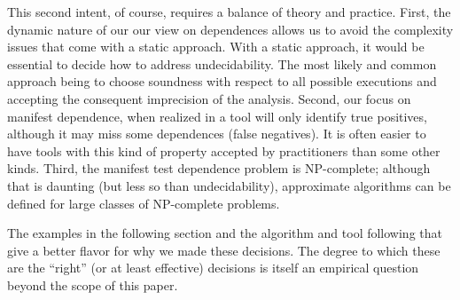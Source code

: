 This second intent, of course, requires a balance of theory and
practice.  First, the dynamic nature of our our view on dependences 
allows us to avoid the complexity issues that come with a static
approach. With a static approach, it would be essential 
to decide how to address undecidability. The most
likely and common approach being to choose soundness with respect to all
possible executions and accepting the consequent imprecision of the analysis.
Second, our focus on manifest dependence, when realized in a tool will
only identify true positives, although it may miss some
dependences (false negatives).  It is often easier to have tools
with this kind of property accepted by practitioners than some other
kinds.  Third, the manifest test dependence problem is NP-complete;
although that is daunting (but less so than undecidability),
approximate algorithms can be defined for large classes of NP-complete
problems.  

The examples in the following section and the algorithm and tool following that
give a better flavor for
why we made these decisions.
The degree to which these are the ``right'' (or at least effective) decisions
is itself an empirical
question beyond the scope of this paper.






